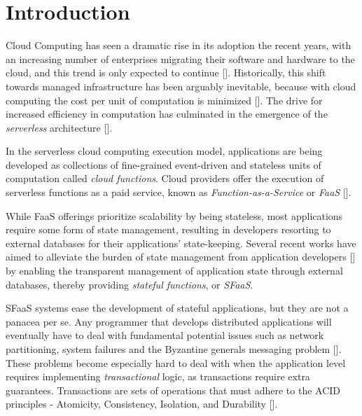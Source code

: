 
\chapter{Introduction}

\label{Chapter1}

Cloud Computing has seen a dramatic rise in its adoption the recent years, with an increasing number of enterprises migrating their software and hardware to the cloud, and this trend is only expected to continue [\cite{serverless-preds}].
Historically, this shift towards managed infrastructure has been arguably inevitable, because with cloud computing the cost per unit of computation is minimized [\cite{rise-of-serverless}].
The drive for increased efficiency in computation has culminated in the emergence of the \textit{serverless} architecture [\cite{serverless-definition}].

In the serverless cloud computing execution model, applications are being developed as collections of fine-grained event-driven and stateless units of computation called \textit{cloud functions}.
Cloud providers offer the execution of serverless functions as a paid service, known as \textit{Function-as-a-Service} or \textit{FaaS} [\cite{faas-definition}].

While FaaS offerings prioritize scalability by being stateless, most applications require some form of state management, resulting in developers resorting to external databases for their applications' state-keeping.
Several recent works have aimed to alleviate the burden of state management from application developers [\cite{orleans,durable-functions,beldi}] by enabling the transparent management of application state through external databases, thereby providing \textit{stateful functions}, or \textit{SFaaS}.

SFaaS systems ease the development of stateful applications, but they are not a panacea per se.
Any programmer that develops distributed applications will eventually have to deal with fundamental potential issues such as network partitioning, system failures and the Byzantine generals messaging problem [\cite{byzantine}].
These problems become especially hard to deal with when the application level requires implementing \textit{transactional} logic, as transactions require extra guarantees. Transactions are sets of operations that must adhere to the ACID principles - Atomicity, Consistency, Isolation, and Durability [\cite{transaction-definition}]. 

